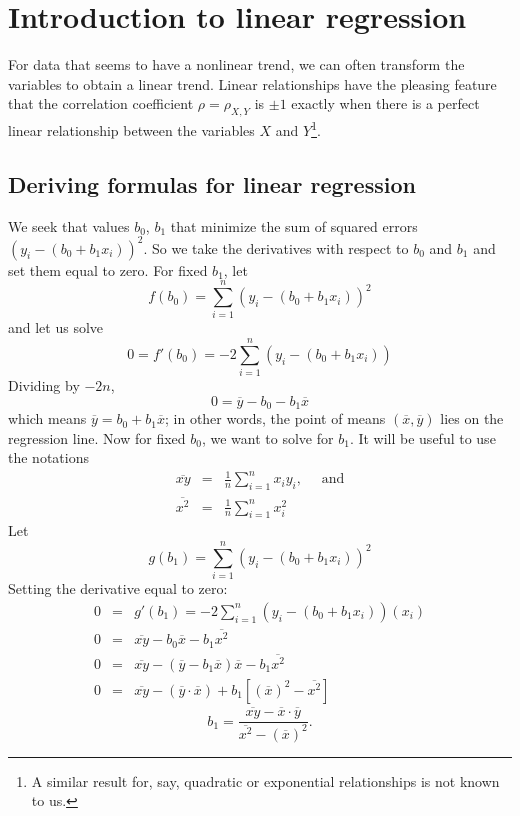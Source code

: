 \chapter{Introduction to linear regression}
\label{linRegrForTwoVar}


For data that seems to have a nonlinear trend, we can often transform the variables to obtain a linear trend.
Linear relationships have the pleasing feature that the correlation coefficient $\rho=\rho_{X,Y}$ is $\pm 1$ exactly when there is a perfect linear relationship between the variables $X$ and $Y$\footnote{A similar result for, say, quadratic or exponential relationships is not known to us.}.



\section{Deriving formulas for linear regression}

We seek that values $b_0$, $b_1$ that minimize the sum of squared errors $(y_i-(b_0+b_1x_i))^2$.
So we take the derivatives with respect to $b_0$ and $b_1$ and set them equal to zero.
For fixed $b_1$, let
\[
	f(b_0) = \sum_{i=1}^n (y_i-(b_0+b_1x_i))^2
\]
and let us solve
\[
	0 = f'(b_0) = -2 \sum_{i=1}^n (y_i-(b_0+b_1x_i))
\]
Dividing by $-2n$,
\[
	0 = \overline y - b_0 - b_1\overline x
\]
which means $\overline y = b_0+b_1\overline x$; in other words, the point of means $(\overline x,\overline y)$ lies on the regression line.
Now for fixed $b_0$, we want to solve for $b_1$.
It will be useful to use the notations
\begin{eqnarray*}
\overline{xy}  &=& \frac1n\sum_{i=1}^nx_iy_i,\quad\text{ and}\\
\overline{x^2}&=& \frac1n\sum_{i=1}^nx_i^2
\end{eqnarray*}
Let
\[
	g(b_1) = \sum_{i=1}^n (y_i-(b_0+b_1x_i))^2
\]
Setting the derivative equal to zero:
\begin{eqnarray*}
	0 &=& g'(b_1) = -2 \sum_{i=1}^n (y_i-(b_0+b_1x_i))(x_i)\\
	0 &=& \overline{xy} - b_0\overline x - b_1\overline{x^2}\\
	0 &=& \overline{xy} - (\overline y-b_1\overline x)\overline x - b_1\overline{x^2}\\
	0 &=& \overline{xy} - (\overline y\cdot \overline x)+b_1[(\overline x)^2 - \overline{x^2}]
\end{eqnarray*}
\begin{equation}\label{b1}
	b_1 = \frac{\overline{xy} - \overline x\cdot\overline y}{\overline{x^2}-(\overline x)^2}.
\end{equation}


